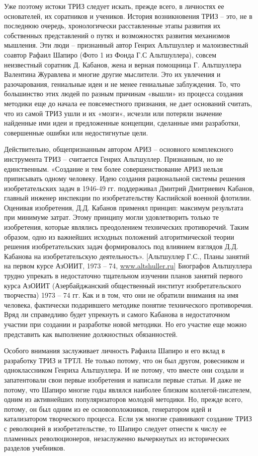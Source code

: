 \documentclass[11pt,a4paper]{article}
\begin{document}
Уже поэтому истоки ТРИЗ следует искать, прежде всего, в личностях ее
основателей, их соратников и учеников. История возникновения ТРИЗ -- это, не в
последнюю очередь, хронологически расставленные этапы развития их собственных
представлений о путях и возможностях развития механизмов мышления. Эти люди --
признанный автор Генрих Альтшуллер и малоизвестный соавтор Рафаил Шапиро (Фото
1 из Фонда Г.С Альтшуллера), совсем неизвестный соратник Д. Кабанов, жена и
верная помощница Г. Альтшуллера Валентина Журавлева и многие другие
мыслители. Это их увлечения и разочарования, гениальные идеи и не менее
гениальные заблуждения. То, что большинство этих людей по разным причинам
«вышли» из процесса создания методики еще до начала ее повсеместного
признания, не дает оснований считать, что из самой ТРИЗ ушли и их «мозги«,
исчезли или потеряли значение найденные ими идеи и предложенные концепции,
сделанные ими разработки, совершенные ошибки или недостигнутые цели.

Действительно, общепризнанным автором АРИЗ -- основного комплексного
инструмента ТРИЗ -- считается Генрих Альтшуллер. Признанным, но не
единственным. «Создание и тем более совершенствование АРИЗ нельзя приписывать
одному человеку. Идею создания рациональной системы решения изобретательских
задач в 1946-49 гг. поддерживал Дмитрий Дмитриевич Кабанов, главный инженер
инспекции по изобретательству Каспийской военной флотилии. Оценивая
изобретения, Д.Д. Кабанов применял принцип: максимум результата при минимуме
затрат. Этому принципу могли удовлетворить только те изобретения, которые
являлись преодолением технических противоречий. Таким образом, одно из
важнейших исходных положений алгоритмической теории решения изобретательских
задач формировалось под влиянием взглядов Д.Д. Кабанова на изобретательскую
деятельность». [Альтшуллер Г.С., Планы занятий на первом курсе АзОИИТ, 1973 --
  74, \url{www.altshuller.ru}] Биографов Альтшуллера трудно упрекать в
недостаточно тщательном изучении планов занятий первого курса АзОИИТ
(Азербайджанский общественный институт изобретательского творчества) 1973 --
74 гг. Как и в том, что они не обратили внимания на имя человека, фактически
подарившего методике понятие технического противоречия. Вряд ли справедливо
будет упрекнуть и самого Кабанова в недостаточном участии при создании и
разработке новой методики. Но его участие еще можно представить как выполнение
должностных обязанностей.

Особого внимания заслуживает личность Рафаила Шапиро и его вклад в разработку
ТРИЗ и ТРТЛ. Не только потому, что он был другом, ровесником и одноклассником
Генриха Альтшуллера. И не потому, что вместе они создали и запатентовали свои
первые изобретения и написали первые статьи. И даже не потому, что Шапиро
многие годы являлся наиболее близким коллегой-писателем, одним из активнейших
популяризаторов молодой методики. Но, прежде всего, потому, он был одним из ее
основоположников, генератором идей и катализатором творческого процесса. Если
уж многие сравнивают создание ТРИЗ с революцией в изобретательстве, то Шапиро
следует отнести к числу ее пламенных революционеров, незаслуженно вычеркнутых
из исторических разделов учебников.
\end{document}
